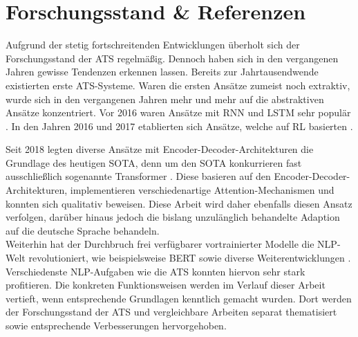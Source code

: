 \section{Forschungsstand \& Referenzen}
\noindent
Aufgrund der stetig fortschreitenden Entwicklungen überholt sich der Forschungsstand der \ac{ATS} regelmäßig. Dennoch haben sich in den vergangenen Jahren gewisse Tendenzen erkennen lassen. Bereits zur Jahrtausendwende existierten erste \ac{ATS}-Systeme. Waren die ersten Ansätze zumeist noch extraktiv, wurde sich in den vergangenen Jahren mehr und mehr auf die abstraktiven Ansätze konzentriert. Vor 2016 waren Ansätze mit \ac{RNN} und \ac{LSTM} sehr populär \cite{NAL16}. In den Jahren 2016 und 2017 etablierten sich Ansätze, welche auf \ac{RL} basierten \cite{PAU17}.
\newpage

\noindent
Seit 2018 legten diverse Ansätze mit Encoder-Decoder-Architekturen die Grundlage des heutigen \ac{SOTA}, denn um den \ac{SOTA} konkurrieren fast ausschließlich sogenannte Transformer \cite{YAN19, ROT20}. Diese basieren auf den Encoder-Decoder-Architekturen, implementieren verschiedenartige Attention-Mechanismen und konnten sich qualitativ beweisen. Diese Arbeit wird daher ebenfalls diesen Ansatz verfolgen, darüber hinaus jedoch die bislang unzulänglich behandelte Adaption auf die deutsche Sprache behandeln.\\

\noindent
Weiterhin hat der Durchbruch frei verfügbarer vortrainierter Modelle die \ac{NLP}-Welt revolutioniert, wie beispielsweise \ac{BERT} sowie diverse Weiterentwicklungen \cite{DEV19}. Verschiedenste \ac{NLP}-Aufgaben wie die \ac{ATS} konnten hiervon sehr stark profitieren. Die konkreten Funktionsweisen werden im Verlauf dieser Arbeit vertieft, wenn entsprechende Grundlagen kenntlich gemacht wurden. Dort werden der Forschungsstand der \ac{ATS} und vergleichbare Arbeiten separat thematisiert sowie entsprechende Verbesserungen hervorgehoben.
